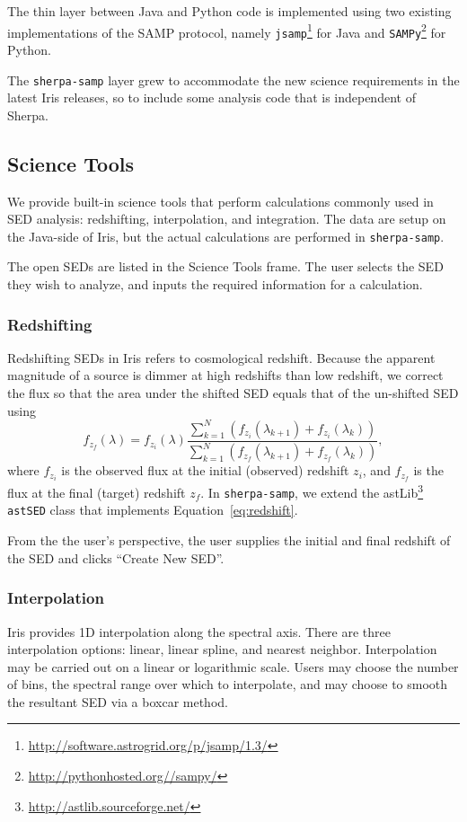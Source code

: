 \documentclass[preprint,authoryear,5p]{elsarticle}
\begin{document}
\begin{sloppypar}
The thin layer between Java and Python code is implemented using two existing
implementations of the SAMP protocol, namely
\verb|jsamp|\footnote{\url{http://software.astrogrid.org/p/jsamp/1.3/}} for Java and
\verb|SAMPy|\footnote{\url{http://pythonhosted.org//sampy/}} for Python.
\end{sloppypar}

The \verb|sherpa-samp| layer grew to accommodate the new science requirements in
the latest Iris releases, so to include some analysis code that is
independent of Sherpa.

\subsection{Science Tools} We provide built-in science tools that perform
calculations commonly used in SED analysis: redshifting, interpolation, and
integration. The data are setup on the Java-side of Iris, but the actual
calculations are performed in \verb|sherpa-samp|.

The open SEDs are listed in the Science Tools frame. The user selects the SED
they wish to analyze, and inputs the required information for a calculation.

\subsubsection{Redshifting} Redshifting SEDs in Iris refers to cosmological
redshift. Because the apparent magnitude of a source is dimmer at high redshifts
than low redshift, we correct the flux so that the area under the shifted SED
equals that of the un-shifted SED using
\begin{equation} \label{eq:redshift} f_{z_{f}}(\lambda) = f_{z_{i}}(\lambda)
\frac{\sum_{k=1}^N
(f_{z_{i}}(\lambda_{k+1})+f_{z_{i}}(\lambda_{k}))}{\sum_{k=1}^N
(f_{z_{f}}(\lambda_{k+1})+f_{z_{f}}(\lambda_{k}))}, \end{equation}
where $f_{z_i}$ is the observed flux at the initial (observed) redshift $z_i$,
and $f_{z_f}$ is the flux at the final (target) redshift $z_f$. In
\verb|sherpa-samp|, we extend the
astLib\footnote{\url{http://astlib.sourceforge.net/}} \texttt{astSED} class that
implements Equation~\ref{eq:redshift}.

From the the user's perspective, the user supplies the initial and final redshift of the
SED and clicks ``Create New SED''.

\subsubsection{Interpolation} Iris provides 1D interpolation along the spectral
axis. There are three interpolation options: linear, linear spline, and nearest
neighbor. Interpolation may be carried out on a linear or logarithmic scale.
Users may choose the number of bins, the spectral range over which to
interpolate, and may choose to smooth the resultant SED via a boxcar method.
\end{document}
